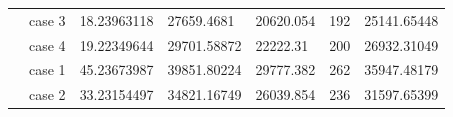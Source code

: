\begin{table}[]
\begin{tabular}{cllllll}
    \rowcolor[HTML]{FFFFC7} 
    \cellcolor[HTML]{FFFFC7}                                                                                               & case 3                  & 18.23963118                                                                            & 27659.4681                                                                                & 20620.054                                                                           & 192                                                                        & 25141.65448                                                                                \\ \cline{2-7} 
    \rowcolor[HTML]{FFFFC7} 
    \multirow{-4}{*}{\cellcolor[HTML]{FFFFC7}4000}                                                                         & case 4                  & 19.22349644                                                                            & 29701.58872                                                                               & 22222.31                                                                            & 200                                                                        & 26932.31049                                                                                \\ \hline
    \rowcolor[HTML]{FFFFC7} 
    \cellcolor[HTML]{FFFFC7}                                                                                               & case 1                  & 45.23673987                                                                            & 39851.80224                                                                               & 29777.382                                                                           & 262                                                                        & 35947.48179                                                                                \\ \cline{2-7} 
    \rowcolor[HTML]{FFFFC7} 
    \cellcolor[HTML]{FFFFC7}                                                                                               & case 2                  & 33.23154497                                                                            & 34821.16749                                                                               & 26039.854                                                                           & 236                                                                        & 31597.65399                                                                                \\ \cline{2-7} 

\end{tabular}
\end{table}
